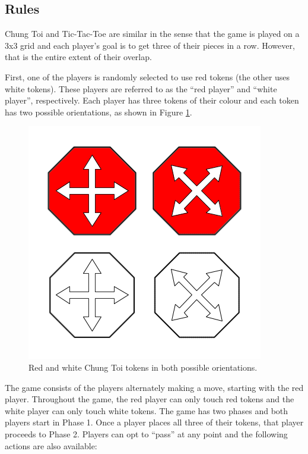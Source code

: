 \documentclass[11pt,a4paper,twoside,openright]{report}
\begin{document}
\subsection{Rules}
\label{sec:ChungToiRules}

Chung Toi \cite{chung-toi-rules} and Tic-Tac-Toe are similar in the sense that the game is played on a 3x3 grid and each player's goal is to get three of their pieces in a row. However, that is the entire extent of their overlap.

First, one of the players is randomly selected to use red tokens (the other uses white tokens). These players are referred to as the ``red player'' and ``white player'', respectively. Each player has three tokens of their colour and each token has two possible orientations, as shown in Figure \ref{chung-toi-tokens}.

\begin{figure}[htbp]
	\begin{center}
		\includegraphics[width=0.3\linewidth]{chung_toi_tokens.png}
		\caption[Chung Toi tokens]{Red and white Chung Toi tokens in both possible orientations.}
		\label{chung-toi-tokens}
	\end{center}
\end{figure}

The game consists of the players alternately making a move, starting with the red player. Throughout the game, the red player can only touch red tokens and the white player can only touch white tokens. The game has two phases and both players start in Phase 1. Once a player places all three of their tokens, that player proceeds to Phase 2. Players can opt to ``pass'' at any point and the following actions are also available:
\end{document}
